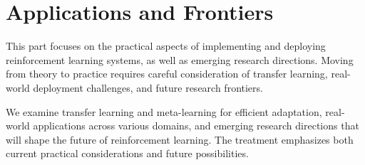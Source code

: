 \part{Applications and Frontiers}

This part focuses on the practical aspects of implementing and deploying reinforcement learning systems, as well as emerging research directions. Moving from theory to practice requires careful consideration of transfer learning, real-world deployment challenges, and future research frontiers.

We examine transfer learning and meta-learning for efficient adaptation, real-world applications across various domains, and emerging research directions that will shape the future of reinforcement learning. The treatment emphasizes both current practical considerations and future possibilities.



